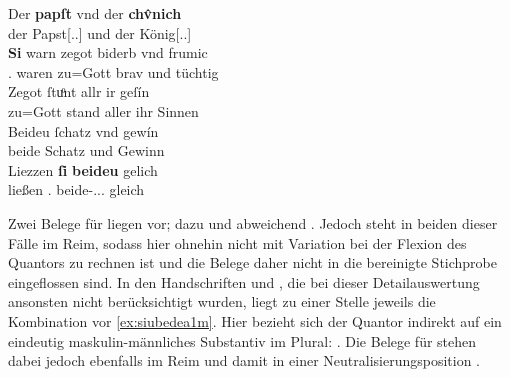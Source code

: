 \begin{exe}
\ex\label{ex:papstkoenig3} %
	\gll Der \textbf{papſt} vnd der \textbf{chv̂nich} \\
		der Papst[\Nom.\Sg.\MascM] und der König[\Nom.\Sg.\MascM] \\
\sn \gll \textbf{Si} warn zegot biderb vnd frumic \\
		\Tpl\subM.\Nom{} waren {zu=Gott} brav und tüchtig \\
\sn \gll Zegot ſtuͦnt allr ir geſín \\
		{zu=Gott} stand aller ihr Sinnen \\
\sn \gll Beideu ſchatz vnd gewín \\
		beide Schatz und Gewinn \\
\sn \gll Liezzen \textbf{ſi} \textbf{beideu} gelich \\
		ließen \Tpl\subM.\Nom{} beide-\Nom.\Pl.\NeutM.\St{} gleich \\
	\begin{taggedline}{\parencites[\pno~17\vb, 30--34]{kc:B1}[vgl. abweichend][6110--6113]{schroeder1895}}
	\trans {}
	\end{taggedline}
\end{exe}

Zwei Belege für  liegen \citet[\pno~21\ra, 25--31 und 22\ra,
34--22\rb, 6]{kc:VB} vor; dazu \citet[4255--4261]{schroeder1895} und
abweichend \citet[4455--4470]{schroeder1895}. Jedoch steht  in
beiden dieser Fälle im Reim, sodass hier ohnehin nicht mit Variation bei der
Flexion des Quantors zu rechnen ist und die Belege daher nicht in die
bereinigte Stichprobe eingeflossen sind. In den Handschriften \citet{kc:A1} und
\citet{kc:M}, die bei dieser Detailauswertung ansonsten nicht berücksichtigt
wurden, liegt zu einer Stelle jeweils die Kombination  vor
\cref{ex:siubedea1m}. Hier bezieht sich der Quantor indirekt auf ein eindeutig
maskulin-männliches Substantiv im Plural:
 . Die Belege für  stehen dabei jedoch
ebenfalls im Reim und damit in einer Neutralisierungsposition
\autocites[vgl.][662--663]{grimm1870}[89]{askedal1973}.

